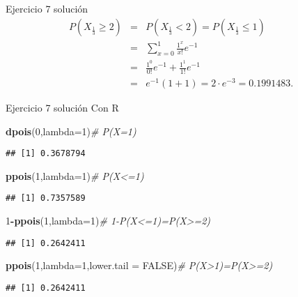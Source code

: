 \documentclass[
  ignorenonframetext,
]{beamer}
\newenvironment{Shaded}{\begin{snugshade}}{\end{snugshade}}
\newcommand{\CommentTok}[1]{\textcolor[rgb]{0.56,0.35,0.01}{\textit{#1}}}
\newcommand{\DataTypeTok}[1]{\textcolor[rgb]{0.13,0.29,0.53}{#1}}
\newcommand{\DecValTok}[1]{\textcolor[rgb]{0.00,0.00,0.81}{#1}}
\newcommand{\KeywordTok}[1]{\textcolor[rgb]{0.13,0.29,0.53}{\textbf{#1}}}
\newcommand{\NormalTok}[1]{#1}
\newcommand{\OperatorTok}[1]{\textcolor[rgb]{0.81,0.36,0.00}{\textbf{#1}}}
\newcommand{\OtherTok}[1]{\textcolor[rgb]{0.56,0.35,0.01}{#1}}
\begin{document}
\begin{frame}{Ejercicio 7 solución}
\protect\hypertarget{ejercicio-7-soluciuxf3n-1}{}
\[
\begin{array}{lll}
P\left(X_{\frac13}\geq 2 \right)&=&P\left(X_{\frac13}< 2 \right)=P\left(X_{\frac13}\leq 1\right)\\
&=&
\sum_{x=0}^1 \frac{1^x}{x!} e^{-1}
\\
&=&
\frac{1^0}{0!} e^{-1}+\frac{1^1}{1!} e^{-1}\\
&=&
e^{-1}\left(1+1\right)=2\cdot e^{-3}=0.1991483.
\end{array}
\]
\end{frame}

\begin{frame}[fragile]{Ejercicio 7 solución}
\protect\hypertarget{ejercicio-7-soluciuxf3n-2}{}
Con R

\begin{Shaded}
\begin{Highlighting}[]
\KeywordTok{dpois}\NormalTok{(}\DecValTok{0}\NormalTok{,}\DataTypeTok{lambda=}\DecValTok{1}\NormalTok{)}\CommentTok{\# P(X=1)}
\end{Highlighting}
\end{Shaded}

\begin{verbatim}
## [1] 0.3678794
\end{verbatim}

\begin{Shaded}
\begin{Highlighting}[]
\KeywordTok{ppois}\NormalTok{(}\DecValTok{1}\NormalTok{,}\DataTypeTok{lambda=}\DecValTok{1}\NormalTok{)}\CommentTok{\# P(X\textless{}=1)}
\end{Highlighting}
\end{Shaded}

\begin{verbatim}
## [1] 0.7357589
\end{verbatim}

\begin{Shaded}
\begin{Highlighting}[]
\DecValTok{1}\OperatorTok{{-}}\KeywordTok{ppois}\NormalTok{(}\DecValTok{1}\NormalTok{,}\DataTypeTok{lambda=}\DecValTok{1}\NormalTok{)}\CommentTok{\# 1{-}P(X\textless{}=1)=P(X\textgreater{}=2)}
\end{Highlighting}
\end{Shaded}

\begin{verbatim}
## [1] 0.2642411
\end{verbatim}

\begin{Shaded}
\begin{Highlighting}[]
\KeywordTok{ppois}\NormalTok{(}\DecValTok{1}\NormalTok{,}\DataTypeTok{lambda=}\DecValTok{1}\NormalTok{,}\DataTypeTok{lower.tail =} \OtherTok{FALSE}\NormalTok{)}\CommentTok{\# P(X\textgreater{}1)=P(X\textgreater{}=2)}
\end{Highlighting}
\end{Shaded}

\begin{verbatim}
## [1] 0.2642411
\end{verbatim}
\end{frame}
\end{document}
